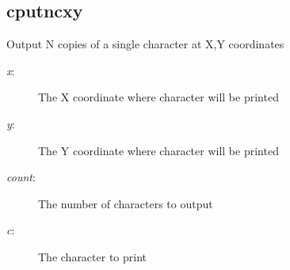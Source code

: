 \subsection{cputncxy}
\begin{description}[leftmargin=2cm,style=nextline]
\item [Description:] {Output N copies of a single character at X,Y coordinates}
\item [Syntax:] 
\item [Parameters:]
\begin{description}\item[]
\item [{\em x}:] {The X coordinate where character will be printed}
\item [{\em y}:] {The Y coordinate where character will be printed}
\item [{\em count}:] {The number of characters to output}
\item [{\em c}:] {The character to print}
\end{description}
\end{description}

